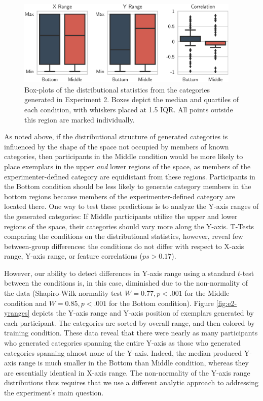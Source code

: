 \documentclass[pdflatex,sn-apa]{sn-jnl}%
\theoremstyle{thmstyleone}%
\theoremstyle{thmstyletwo}%
\theoremstyle{thmstylethree}%
\begin{document}
\begin{figure}
    \begin{center} \includegraphics[width=0.95\textwidth]{figs/e2-statsboxes.eps}
    \caption{Box-plots of the distributional statistics from the categories
generated in Experiment 2. Boxes depict the median and quartiles of each
condition, with whiskers placed at 1.5 IQR. All points outside this region are
marked individually.}
    \label{fig:e2-statsboxes}
    \end{center}
\end{figure}


As noted above, if the distributional structure of generated categories is
influenced by the shape of the space not occupied by members of known
categories, then participants in the Middle condition would be more likely to
place exemplars in the upper {\em and} lower regions of the space, as members of
the experimenter-defined category are equidistant from these regions.
Participants in the Bottom condition should be less likely to generate category
members in the bottom regions because members of the experimenter-defined
category are located there. One way to test these predictions is to analyze the
Y-axis ranges of the generated categories: If Middle participants utilize the
upper and lower regions of the space, their categories should vary more along
the Y-axis. T-Tests comparing the conditions on the distributional statistics,
however, reveal few between-group differences: the conditions do not differ with
respect to X-axis range, Y-axis range, or feature correlations ($ps>0.17$).

However, our ability to detect differences in Y-axis range using a standard
$t$-test between the conditions is, in this case, diminished due to the
non-normality of the data (Shapiro-Wilk normality test $W=0.77, p < .001$ for
the Middle condition and $W=0.85, p < .001$ for the Bottom condition). Figure \ref{fig:e2-yranges} depicts the Y-axis range and Y-axis position of exemplars generated by each participant. The categories are sorted by overall range, and then colored by training condition. These data reveal that there were nearly as many
participants who generated categories spanning the entire Y-axis as those who
generated categories spanning almost none of the Y-axis. Indeed, the median produced Y-axis range is much smaller in the Bottom than Middle condition, whereas they are essentially identical in X-axis range. The non-normality of the Y-axis range distributions thus requires that we use a different analytic approach to
addressing the experiment's main question.
\end{document}
